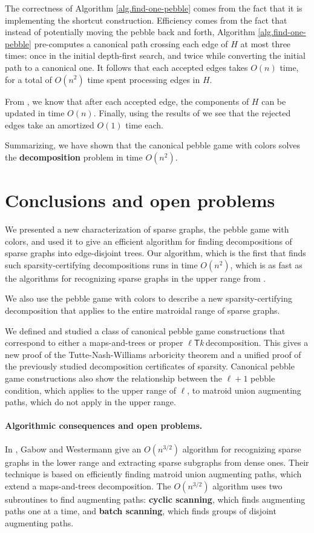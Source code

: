 \documentclass[11pt]{article}
\newcommand{\ellteekay}{\ensuremath{\ell{\mathsf T}k}\,}
\newcommand{\refalg}[1]{Algorithm \ref{alg.#1}}
\begin{document}
	The correctness of \refalg{find-one-pebble} comes from the fact that it is
	implementing the shortcut construction.
	Efficiency comes from the fact that instead of potentially moving the 
	pebble back and forth, \refalg{find-one-pebble} pre-computes a canonical
	path crossing each edge of $H$ at most three times: once in the initial
	depth-first search, and twice while converting the initial path to a 
	canonical one.  It follows that each accepted edges takes $O(n)$ time, for
	a total of $O(n^2)$ time spent processing edges in $H$.

	From \cite{LeSt05}, we know that after each accepted edge, the components of $H$ 
	can be updated in time $O(n)$. Finally, using the results of 
	\cite{LeSt05,cccg} we see that the rejected edges take an amortized $O(1)$ time each.

	Summarizing, we have shown that the canonical pebble game with colors 
	solves the {\bf decomposition} problem in time $O(n^2)$.

	\section{Conclusions and open problems}
	We presented a new characterization of sparse graphs, the pebble game with colors, and
	used it to give an efficient algorithm for finding decompositions of sparse 
	graphs into edge-disjoint trees.  Our algorithm, which is the first that
	finds such sparsity-certifying decompositions runs in time $O(n^2)$, which 
	is as fast as the algorithms for recognizing sparse graphs in the upper range 
	from \cite{LeSt05}.

	We also use the pebble game with colors to describe a new sparsity-certifying 
	decomposition that applies to the entire matroidal range of sparse graphs.

	We defined and studied a class of canonical pebble game constructions that correspond to either a
	 maps-and-trees or proper \ellteekay decomposition. This gives a new proof of the Tutte-Nash-Williams 
	arboricity theorem and a unified proof of the previously studied decomposition certificates of sparsity.
	Canonical pebble game constructions also show the relationship
	between the $\ell+1$ pebble condition, which applies to the upper range of 
	$\ell$, to matroid union augmenting paths, which do not apply in the upper range.
	
	\paragraph{Algorithmic consequences and open problems.}
	In \cite{GaWe88}, Gabow and Westermann give an $O(n^{3/2})$ algorithm for recognizing sparse
	graphs in the lower range and extracting sparse subgraphs from dense ones.  Their technique 
	is based on efficiently finding matroid union augmenting paths, which extend  a maps-and-trees
	decomposition.  The $O(n^{3/2})$ algorithm uses two subroutines to find augmenting paths: {\bf 
	cyclic scanning}, which finds augmenting paths one at a time, and {\bf batch scanning}, which 
	finds groups of disjoint augmenting paths.
	
\end{document}
